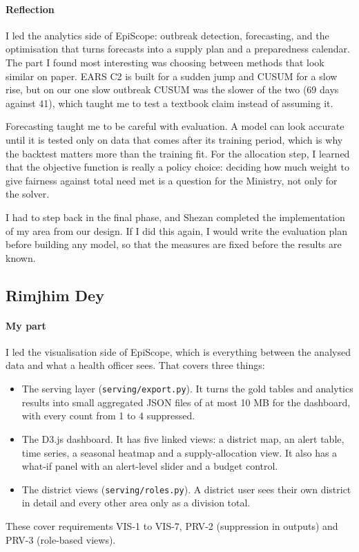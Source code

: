 \paragraph*{Reflection} I led the analytics side of EpiScope: outbreak detection, forecasting, and the optimisation that turns forecasts
into a supply plan and a preparedness calendar. The part I found most interesting was choosing between methods
that look similar on paper. EARS C2 is built for a sudden jump and CUSUM for a slow rise, but on our one slow
outbreak CUSUM was the slower of the two (69 days against 41), which taught me to test a textbook claim instead
of assuming it.

Forecasting taught me to be careful with evaluation. A model can look accurate until it is tested only on data
that comes after its training period, which is why the backtest matters more than the training fit. For the
allocation step, I learned that the objective function is really a policy choice: deciding how much weight to give
fairness against total need met is a question for the Ministry, not only for the solver.

I had to step back in the final phase, and Shezan completed the implementation of my area from our design. If I did
this again, I would write the evaluation plan before building any model, so that the measures are fixed before the
results are known.

\subsection*{Rimjhim Dey}
\paragraph*{My part} I led the visualisation side of EpiScope, which is everything between the analysed
data and what a health officer sees. That covers three things:
\begin{itemize}
\item The serving layer (\texttt{serving/export.py}). It turns the gold tables and analytics results into small
aggregated JSON files of at most 10 MB for the dashboard, with every count from 1 to 4 suppressed.
\item The D3.js dashboard. It has five linked views: a district map, an alert table, time series, a seasonal
heatmap and a supply-allocation view. It also has a what-if panel with an alert-level slider and a budget control.
\item The district views (\texttt{serving/roles.py}). A district user sees their own district in detail and every
other area only as a division total.
\end{itemize}
These cover requirements VIS-1 to VIS-7, PRV-2 (suppression in outputs) and PRV-3 (role-based views).

